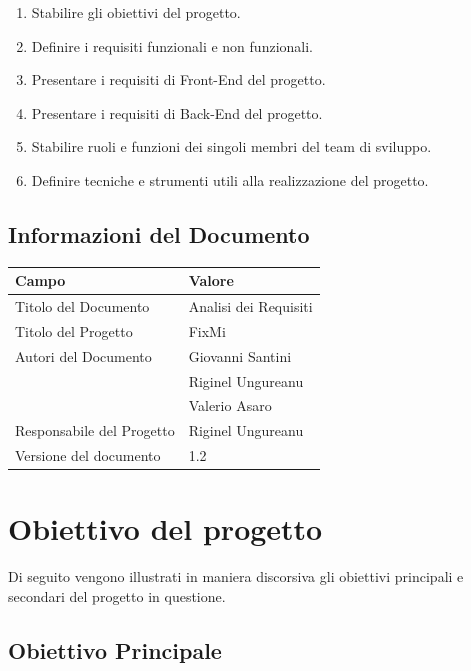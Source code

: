 \documentclass{report}
\begin{document}
\begin{enumerate}
		
	\item Stabilire gli obiettivi del progetto.
	\item Definire i requisiti funzionali e non funzionali.
	\item Presentare i requisiti di Front-End del progetto.
	\item Presentare i requisiti di Back-End del progetto.
	\item Stabilire ruoli e funzioni dei singoli membri del team di sviluppo.
	\item Definire tecniche e strumenti utili alla realizzazione del progetto.

\end{enumerate}


\section{Informazioni del Documento}

\begin{center} %
	\centering
	\begin{tabular}{ |p{4cm}|p{4cm}|  }
		\hline
		\centering Campo & \qquad\qquad Valore \\ %
		\hline
		Titolo del Documento & Analisi dei Requisiti \\
		\hline
		Titolo del Progetto & FixMi \\
		\hline
		Autori del Documento &
		Giovanni Santini \\ & Riginel Ungureanu \\ & Valerio Asaro \\
		\hline
		Responsabile del Progetto & Riginel Ungureanu\\
		\hline
		Versione del documento & 1.2 \\
		\hline
	\end{tabular}
\end{center}


\chapter{Obiettivo del progetto}


Di seguito vengono illustrati in maniera discorsiva gli obiettivi principali e secondari del progetto in questione.

\section{Obiettivo Principale}
\end{document}
